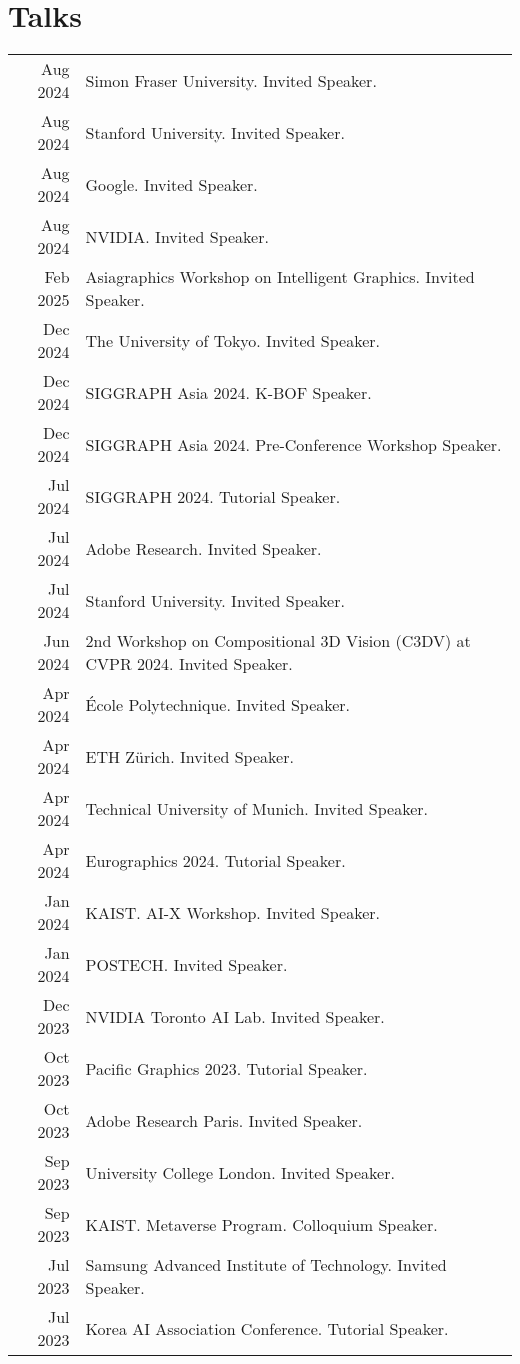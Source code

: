 \documentclass[letterpaper,10pt]{article} %
\begin{document}
{{\section{Talks}
\begin{tabular}{r|p{11cm}}
Aug 2024 & Simon Fraser University. Invited Speaker.\\
Aug 2024 & Stanford University. Invited Speaker.\\
Aug 2024 & Google. Invited Speaker.\\
Aug 2024 & NVIDIA. Invited Speaker.\\
Feb 2025 & Asiagraphics Workshop on Intelligent Graphics. Invited Speaker.\\
Dec 2024 & The University of Tokyo. Invited Speaker.\\
Dec 2024 & SIGGRAPH Asia 2024. K-BOF Speaker.\\
Dec 2024 & SIGGRAPH Asia 2024. Pre-Conference Workshop Speaker.\\
Jul 2024 & SIGGRAPH 2024. Tutorial Speaker.\\
Jul 2024 & Adobe Research. Invited Speaker.\\
Jul 2024 & Stanford University. Invited Speaker.\\
Jun 2024 & 2nd Workshop on Compositional 3D Vision (C3DV) at CVPR 2024. Invited Speaker.\\
Apr 2024 & \'Ecole Polytechnique. Invited Speaker.\\
Apr 2024 & ETH Z\"urich. Invited Speaker.\\
Apr 2024 & Technical University of Munich. Invited Speaker.\\
Apr 2024 & Eurographics 2024. Tutorial Speaker.\\
Jan 2024 & KAIST. AI-X Workshop. Invited Speaker.\\
Jan 2024 & POSTECH. Invited Speaker.\\
Dec 2023 & NVIDIA Toronto AI Lab. Invited Speaker.\\
Oct 2023 & Pacific Graphics 2023. Tutorial Speaker.\\
Oct 2023 & Adobe Research Paris. Invited Speaker.\\
Sep 2023 & University College London. Invited Speaker.\\
Sep 2023 & KAIST. Metaverse Program. Colloquium Speaker.\\
Jul 2023 & Samsung Advanced Institute of Technology. Invited Speaker.\\
Jul 2023 & Korea AI Association Conference. Tutorial Speaker.\\

\end{tabular}}}
\end{document}
